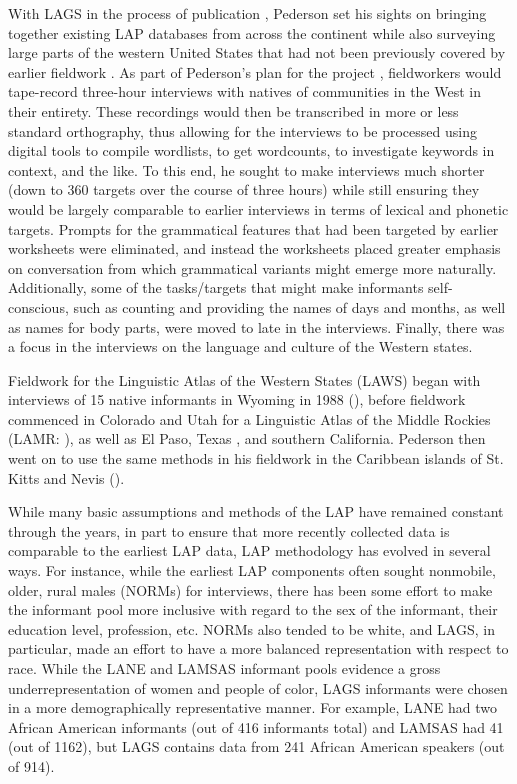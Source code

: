 \documentclass[output=paper]{langscibook}
\begin{document}
With LAGS in the process of publication \citep{PedersonCarolAdams1986}, Pederson set his sights on bringing together existing LAP databases from across the continent while also surveying large parts of the western United States that had not been previously covered by earlier fieldwork \citep{Pederson1996b}. As part of Pederson’s plan for the project \citep{Pederson1990}, fieldworkers would tape-record three-hour interviews with natives of communities in the West in their entirety. These recordings would then be transcribed in more or less standard orthography, thus allowing for the interviews to be processed using digital tools to compile wordlists, to get wordcounts, to investigate keywords in context, and the like. To this end, he sought to make interviews much shorter (down to 360 targets over the course of three hours) while still ensuring they would be largely comparable to earlier interviews in terms of lexical and phonetic targets. Prompts for the grammatical features that had been targeted by earlier worksheets were eliminated, and instead the worksheets placed greater emphasis on conversation from which grammatical variants might emerge more naturally. Additionally, some of the tasks/targets that might make informants self-conscious, such as counting and providing the names of days and months, as well as names for body parts, were moved to late in the interviews. Finally, there was a focus in the interviews on the language and culture of the Western states.

Fieldwork for the Linguistic Atlas of the Western States (LAWS) began with interviews of 15 native informants in Wyoming in 1988 (\citealt{PedersonMadsen1989}), before fieldwork commenced in Colorado and Utah for a Linguistic Atlas of the Middle Rockies (LAMR: \citealt{Pederson1996b, Antieau2012, AntieauDarwin2013}), as well as El Paso, Texas \citep{Hamilton-Brehm2003}, and southern California. Pederson then went on to use the same methods in his fieldwork in the Caribbean islands of St. Kitts and Nevis (\citealt{BakerPederson2013}). 

While many basic assumptions and methods of the LAP have remained constant through the years, in part to ensure that more recently collected data is comparable to the earliest LAP data, LAP methodology has evolved in several ways. For instance, while the earliest LAP components often sought nonmobile, older, rural males (NORMs) for interviews, there has been some effort to make the informant pool more inclusive with regard to the sex of the informant, their education level, profession, etc. NORMs also tended to be white, and LAGS, in particular, made an effort to have a more balanced representation with respect to race. While the LANE and LAMSAS informant pools evidence a gross underrepresentation of women and people of color, LAGS informants were chosen in a more demographically representative manner. For example, LANE had two African American informants (out of 416 informants total) and LAMSAS had 41 (out of 1162), but LAGS contains data from 241 African American speakers (out of 914). 
\end{document}
